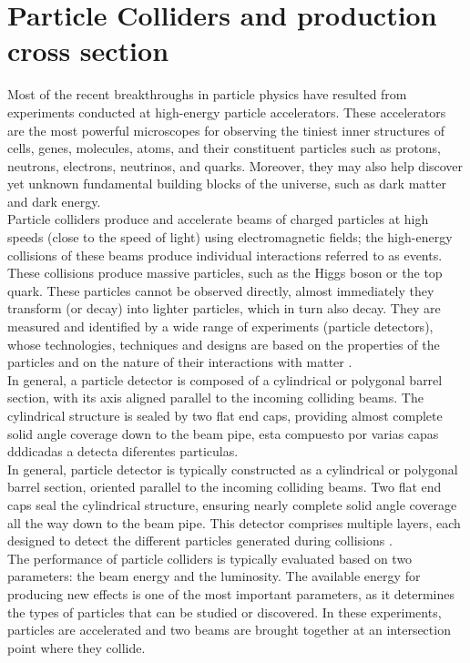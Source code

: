 \section{Particle Colliders and production cross section}

Most of the recent breakthroughs in particle physics have resulted from experiments conducted at high-energy particle accelerators. These accelerators are the most powerful microscopes for observing the tiniest inner structures of cells, genes, molecules, atoms, and their constituent particles such as protons, neutrons, electrons, neutrinos, and quarks. Moreover, they may also help discover yet unknown fundamental building blocks of the universe, such as dark matter and dark energy.\\

Particle colliders produce and accelerate beams of charged particles at high speeds (close to the speed of light) using electromagnetic fields; the high-energy collisions of these beams produce individual interactions referred to as events. These collisions produce massive particles, such as the Higgs boson or the top quark. These particles  cannot be observed directly, almost immediately they transform (or decay) into lighter particles, which in turn also decay. They are measured and identified by a wide range of experiments (particle detectors), whose technologies, techniques and designs are based on the properties of the particles and on the nature of their interactions with matter \cite{thomson_2013}.\\

In general, a particle detector is composed of a cylindrical or polygonal barrel section, with its axis aligned parallel to the incoming colliding beams. The cylindrical structure is sealed by two flat end caps, providing almost complete solid angle coverage down to the beam pipe, esta compuesto por varias capas dddicadas a detecta diferentes particulas.\\  

In general, particle detector is typically constructed as a cylindrical or polygonal barrel section, oriented parallel to the incoming colliding beams. Two flat end caps seal the cylindrical structure, ensuring nearly complete solid angle coverage all the way down to the beam pipe. This detector comprises multiple layers, each designed to detect the different particles generated during collisions \cite{thomson_2013}.\\

The performance of particle colliders is typically evaluated based on two parameters: the beam energy and the luminosity. The available energy for producing new effects is one of the most important parameters, as it determines the types of particles that can be studied or discovered. In these experiments, particles are accelerated and two beams are brought together at an intersection point where they collide.\\

